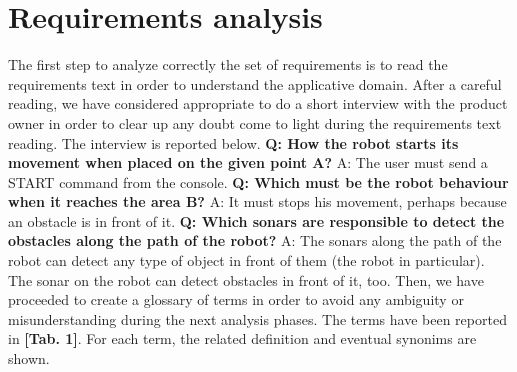 \documentclass[a4paper]{article}
\begin{document}
\section{Requirements analysis }

The first step to analyze correctly the set of requirements is to read the requirements text in order to understand the applicative domain.\newline\newline
After a careful reading, we have considered appropriate to do a short interview with the product owner in order to clear up any doubt come to light during the requirements text reading. The interview is reported below.\newline\newline
\textbf{Q: How the robot starts its movement when placed on the given point A?}\newline
A: The user must send a START command from the console.\newline\newline
\textbf{Q: Which must be the robot behaviour when it reaches the area B?}\newline
A: It must stops his movement, perhaps because an obstacle is in front of it.\newline\newline
\textbf{Q: Which sonars are responsible to detect the obstacles along the path of the robot?}\newline
A: The sonars along the path of the robot can detect any type of object in front of them (the robot in particular). The sonar on the robot can detect obstacles in front of it, too.\newline\newline
Then, we have proceeded to create a glossary of terms in order to avoid any ambiguity or misunderstanding during the next analysis phases. The terms have been reported in \textbf{[Tab. 1]}. For each term, the related definition and eventual synonims are shown. \hfill \break
\end{document}
